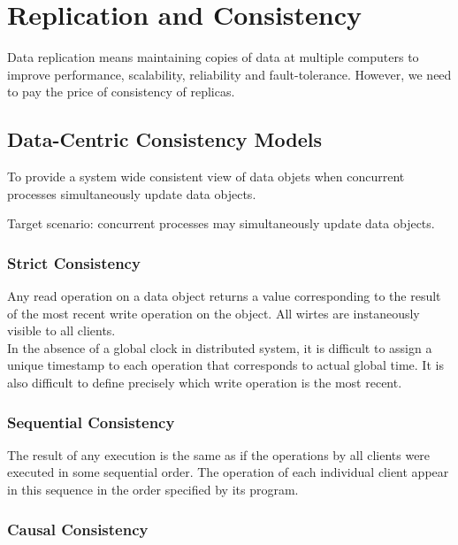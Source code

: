 \chapter{Replication and Consistency}
\begin{multicols*}{2}

\noindent Data replication means maintaining copies of data at multiple computers to improve performance, scalability, reliability and fault-tolerance. However, we need to pay the price of consistency of replicas.

\section{Data-Centric Consistency Models}

\noindent To provide a system wide consistent view of data objets when concurrent processes simultaneously update data objects.

\noindent Target scenario: concurrent processes may simultaneously update data objects.

\subsection{Strict Consistency}

\noindent Any read operation on a data object returns a value corresponding to the result of the most recent write operation on the object. All wirtes are instaneously visible to all clients. \\

\noindent In the absence of a global clock in distributed system, it is difficult to assign a unique timestamp to each operation that corresponds to actual global time. It is also difficult to define precisely which write operation is the most recent. 

\subsection{Sequential Consistency}

\noindent The result of any execution is the same as if the operations by all clients were executed in some sequential order. The operation of each individual client appear in this sequence in the order specified by its program. 

\subsection{Causal Consistency}


\end{multicols*}
